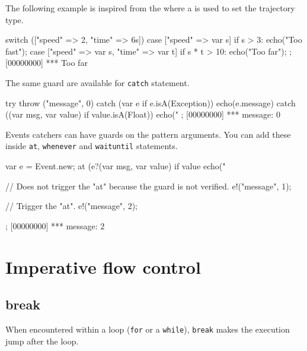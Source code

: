 The following example is inspired from the 
where a  is used to set the trajectory type.

\begin{urbiscript}
switch (["speed" => 2, "time" => 6s])
{
  case ["speed" => var s] if s > 3:
    echo("Too fast");
  case ["speed" => var s, "time" => var t] if s * t > 10:
    echo("Too far");
};
[00000000] *** Too far
\end{urbiscript}

The same guard are available for \lstinline{catch} statement.

\begin{urbiscript}
try
{
  throw ("message", 0)
}
catch (var e if e.isA(Exception))
{
  echo(e.message)
}
catch ((var msg, var value) if value.isA(Float))
{
  echo("%
};
[00000000] *** message: 0
\end{urbiscript}

Events catchers can have guards on the pattern arguments.  You can add these
inside \lstinline{at}, \lstinline{whenever} and \lstinline{waituntil}
statements.

\begin{urbiscript}
{
  var e = Event.new;
  at (e?(var msg, var value) if value %
    echo("%

  // Does not trigger the "at" because the guard is not verified.
  e!("message", 1);

  // Trigger the "at".
  e!("message", 2);
};
[00000000] *** message: 2
\end{urbiscript}


\section{Imperative flow control}

\subsection{break}
\label{sec:lang:break}

When encountered within a loop (\lstinline|for| or a \lstinline|while|),
\lstinline|break| makes the execution jump after the loop.

